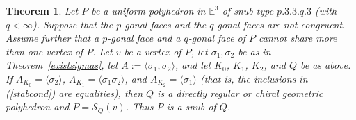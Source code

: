\documentclass[12pt]{article}
\newtheorem{theorem}{Theorem}[section]
\theoremstyle{definition}\newtheorem{definition}{Definition}[section]
\begin{document}
\begin{theorem}
\label{thm: completeness condition}
Let $P$ be a uniform polyhedron in $\mathbb{E}^3$ of snub type $p.3.3.q.3$ (with $q<\infty$). Suppose that the $p$-gonal faces and the $q$-gonal faces are not congruent. Assume further that a $p$-gonal face and a $q$-gonal face of $P$ cannot share more than one vertex of $P$. Let $v$ be a vertex of $P$, let $\sigma_1,\sigma_2$ be as in Theorem~\ref{existsigmas}, let $A:=\langle\sigma_1,\sigma_2\rangle$, and let 
$K_0$, $K_1$, $K_2$, and $Q$ be as above.  If $A_{K_0} = \langle \sigma_2 \rangle$, $A_{K_1} = \langle \sigma_1\sigma_2 \rangle$, and $A_{K_2} = \langle \sigma_1 \rangle$ (that is, the inclusions in (\ref{stabcond}) are  equalities), then $Q$ is a directly regular or chiral geometric polyhedron and $P=\mathcal{S}_Q(v)$. Thus $P$ is a snub of $Q$.
\end{theorem}
\smallskip
\end{document}
